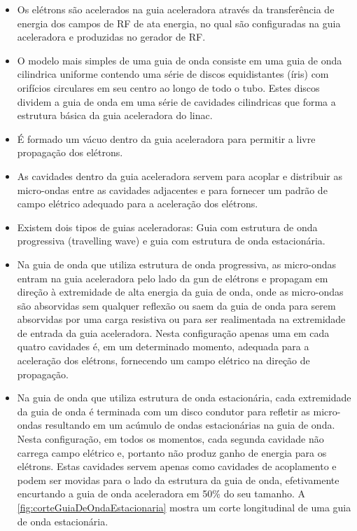 \documentclass[11pt,a4paper]{article}
\begin{document}
    \begin{itemize}
		\item Os elétrons são acelerados na guia aceleradora através da transferência de energia dos campos de RF de ata energia, no qual são configuradas na guia aceleradora e produzidas no gerador de RF. 
		
		\item O modelo mais simples de uma guia de onda consiste em uma guia de onda cilindrica uniforme contendo uma  série de discos equidistantes (íris) com orifícios circulares em seu centro ao longo de todo o tubo. Estes discos dividem a guia de onda em uma série de cavidades cilindricas que forma a estrutura básica da guia aceleradora do linac. 
		
		\item É formado um vácuo dentro da guia aceleradora para permitir a livre propagação dos elétrons.
		
		\item As cavidades dentro da guia aceleradora servem para acoplar e distribuir as micro-ondas entre as cavidades adjacentes e para fornecer um padrão de campo elétrico adequado para a aceleração dos elétrons.
		
		\item Existem dois tipos de guias aceleradoras: Guia com estrutura de onda progressiva (travelling wave) e guia com estrutura de onda estacionária.
		
		\item Na guia de onda que utiliza estrutura de onda progressiva, as micro-ondas entram na guia aceleradora pelo lado da gun de elétrons e propagam em direção à extremidade de alta energia da guia de onda, onde as micro-ondas são absorvidas sem qualquer reflexão ou saem da guia de onda para serem absorvidas por uma carga resistiva ou para ser realimentada na extremidade de entrada da guia aceleradora. Nesta configuração apenas uma em cada quatro cavidades é, em um determinado momento, adequada para a aceleração dos elétrons, fornecendo um campo elétrico na direção de propagação.
		
		\item Na guia de onda que utiliza estrutura de onda estacionária, cada extremidade da guia de onda é terminada com um disco condutor para refletir as micro-ondas resultando em um acúmulo de ondas estacionárias na guia de onda. Nesta configuração, em todos os momentos, cada segunda cavidade não carrega campo elétrico e, portanto não produz ganho de energia para os elétrons. Estas cavidades servem apenas como cavidades de acoplamento e podem ser movidas para o lado da estrutura da guia de onda, efetivamente encurtando a guia de onda aceleradora em 50\% do seu tamanho. A \ref{fig:corteGuiaDeOndaEstacionaria} mostra um corte longitudinal de uma guia de onda estacionária.
	\end{itemize}                
\end{document}
